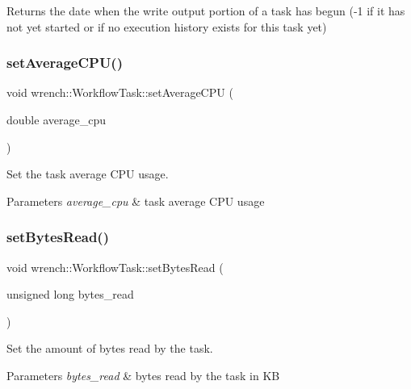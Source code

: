 \begin{DoxyReturn}{Returns}
the date when the write output portion of a task has begun (-\/1 if it has not yet started or if no execution history exists for this task yet) 
\end{DoxyReturn}
\mbox{\label{classwrench_1_1_workflow_task_a8f4207c4fc2eea8f6370701a747a5238}} 
\subsubsection{\texorpdfstring{set\+Average\+C\+P\+U()}{setAverageCPU()}}
{\footnotesize\ttfamily void wrench\+::\+Workflow\+Task\+::set\+Average\+C\+PU (\begin{DoxyParamCaption}\item[{double}]{average\+\_\+cpu }\end{DoxyParamCaption})}



Set the task average C\+PU usage. 


\begin{DoxyParams}{Parameters}
{\em average\+\_\+cpu} & task average C\+PU usage \\
\hline
\end{DoxyParams}
\mbox{\label{classwrench_1_1_workflow_task_ab438ab4409f1ddcb423c90577a611fe6}} 
\subsubsection{\texorpdfstring{set\+Bytes\+Read()}{setBytesRead()}}
{\footnotesize\ttfamily void wrench\+::\+Workflow\+Task\+::set\+Bytes\+Read (\begin{DoxyParamCaption}\item[{unsigned long}]{bytes\+\_\+read }\end{DoxyParamCaption})}



Set the amount of bytes read by the task. 


\begin{DoxyParams}{Parameters}
{\em bytes\+\_\+read} & bytes read by the task in KB \\
\hline
\end{DoxyParams}
\mbox{\label{classwrench_1_1_workflow_task_a8291e3248b7246eab498fc0378199b76}} 
